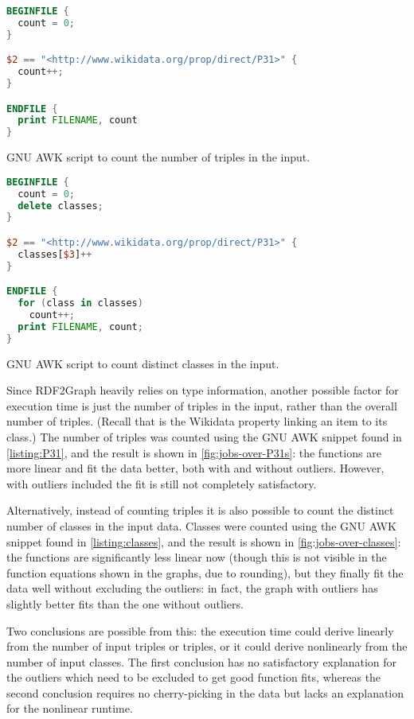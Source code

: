 \begin{lstfloat}[b]
\begin{lstlisting}[language=awk]
BEGINFILE {
  count = 0;
}

$2 == "<http://www.wikidata.org/prop/direct/P31>" {
  count++;
}

ENDFILE {
  print FILENAME, count
}
\end{lstlisting}
\caption{GNU AWK script to count the number of  triples in the input.}
\label{listing:P31}
\end{lstfloat}

\begin{lstfloat}[b]
\begin{lstlisting}[language=awk]
BEGINFILE {
  count = 0;
  delete classes;
}

$2 == "<http://www.wikidata.org/prop/direct/P31>" {
  classes[$3]++
}

ENDFILE {
  for (class in classes)
    count++;
  print FILENAME, count;
}
\end{lstlisting}
\caption{GNU AWK script to count distinct classes in the input.}
\label{listing:classes}
\end{lstfloat}

Since RDF2Graph heavily relies on type information,
another possible factor for execution time
is just the number of  triples in the input,
rather than the overall number of triples.
(Recall that  is the Wikidata property linking an item to its class.)
The number of  triples was counted
using the GNU AWK snippet found in \cref{listing:P31},
and the result is shown in \cref{fig:jobs-over-P31s}:
the functions are more linear and fit the data better, both with and without outliers.
However, with outliers included the fit is still not completely satisfactory.

Alternatively, instead of counting  triples
it is also possible to count the distinct number of classes in the input data.
Classes were counted using the GNU AWK snippet found in \cref{listing:classes},
and the result is shown in \cref{fig:jobs-over-classes}:
the functions are significantly less linear now
(though this is not visible in the function equations shown in the graphs, due to rounding),
but they finally fit the data well without excluding the outliers:
in fact, the graph with outliers has slightly better fits than the one without outliers.

Two conclusions are possible from this:
the execution time could derive linearly from the number of input triples or  triples,
or it could derive nonlinearly from the number of input classes.
The first conclusion has no satisfactory explanation for the outliers
which need to be excluded to get good function fits,
whereas the second conclusion requires no cherry-picking in the data
but lacks an explanation for the nonlinear runtime.

